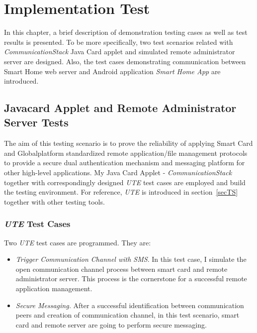 \chapter{Implementation Test} \label{secImpl}
In this chapter, a brief description of demonstration testing cases as well as test results is presented. To be more specifically, two test scenarios related with \emph{CommunicationStack} Java Card applet and simulated remote administrator server are designed. Also, the test cases demonstrating communication between Smart Home web server and Android application \emph{Smart Home App} are introduced.

\section{Javacard Applet and Remote Administrator Server Tests}
The aim of this testing scenario is to prove the reliability of applying Smart Card and Globalplatform standardized remote application/file management protocols to provide a secure dual authentication mechanism and messaging platform for other high-level applications. My Java Card Applet - \emph{CommunicationStack} together with correspondingly designed \emph{UTE} test cases are employed and build the testing environment. For reference, \emph{UTE} is introduced in section~\ref{secTS} together with other testing tools.

\subsection{\emph{UTE} Test Cases}

Two \emph{UTE} test cases are programmed. They are:
\begin{itemize}
\item \emph{Trigger Communication Channel with SMS}. In this test case, I simulate the open communication channel process between smart card and remote administrator server. This process is the cornerstone for a successful remote application management.
\item \emph{Secure Messaging.} After a successful identification between communication peers and creation of communication channel, in this test scenario, smart card and remote server are going to perform secure messaging. 
\end{itemize}

